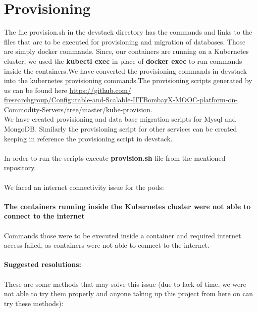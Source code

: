 \documentclass[12pt]{report}
\begin{document}
\section{Provisioning}
The file provision.sh in the devstack directory has the commands and links to the files that are to be executed for provisioning and migration of databases. Those are simply docker commands. Since, our containers are running on a Kubernetes cluster, we used the \textbf{kubectl exec} in place of \textbf{docker exec} to run commands inside the containers.We have converted the provisioning commands in devstack into the kubernetes provisioning commands.The provisioning scripts generated by us can be found here \href{https://github.com/fresearchgroup/Configurable-and-Scalable-IITBombayX-MOOC-platform-on-Commodity-Servers/tree/master/kube-provision}{https://github.com/\\fresearchgroup/Configurable-and-Scalable-IITBombayX-MOOC-platform-on-Commodity-Servers/tree/master/kube-provision}\cite{Kubeprov}.\\
 We have created provisioning and data base migration scripts for Mysql and MongoDB. Similarly the provisioning script for other services can be created keeping in reference the provisioning script in devstack. \\\\
 In order to run the scripts execute \textbf{provision.sh} file from the mentioned repository. \\\\
 We faced an internet connectivity issue for the pods: \\\\
\textbf{The containers running inside the Kubernetes cluster were not able to connect to the internet}\\\\
Commands those were to be executed inside a container and required internet access failed, as containers were not able to connect to the internet.\\\\
\textbf{Suggested resolutions:\\\\}These are some methods that may solve this issue (due to lack of time, we were not able to try them properly and anyone taking up this project from here on can try these methods):
\end{document}
